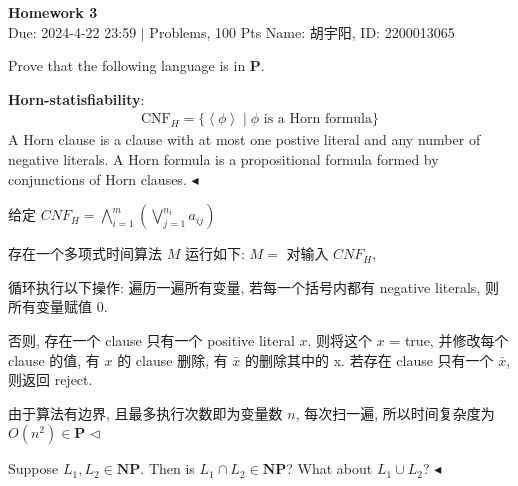 \documentclass[11pt]{article}
\newcommand{\mP}{\mathbf{P}}
\newcommand{\NP}{\mathbf{NP}}
\newenvironment{problem}[2][Problem]{\begin{trivlist}
		\item[\hskip \labelsep {\bfseries #1}\hskip \labelsep {\bfseries #2.}]}{\hfill$\blacktriangleleft$\end{trivlist}}
\newenvironment{answer}[1][Answer]{\begin{trivlist}
		\item[\hskip \labelsep {\bfseries #1.}\hskip \labelsep]}{\hfill$\lhd$\end{trivlist}}
\begin{document}
	\pagestyle{fancy}
	\chead{}
	\begin{center}
		{\LARGE \bf Homework 3}\\
		{Due: 2024-4-22 23:59 \quad$|$ Problems, 100 Pts}
		{Name: 胡宇阳, ID: 2200013065}
	\end{center}
	\begin{problem}{1.(18 points)}
		Prove that the following language is in $\mP$.
		
		\textbf{Horn-statisfiability}:
		\begin{align*}
			\text{CNF}_H = \{ \left\langle\phi\right\rangle \mid \phi \text{ is a Horn formula}\}
		\end{align*}
		A Horn clause is a clause with at most one postive literal and any number of negative literals. A Horn formula is a propositional formula formed by conjunctions of Horn clauses.
	\end{problem}
	\begin{answer}
		给定 $CNF_H=\bigwedge\limits_{i=1}^{m}\left(\bigvee\limits_{j=1}^{n_i}{a_{ij}}\right)$
		
		存在一个多项式时间算法 $M$ 运行如下:
		$M=$ 对输入 $CNF_H$,
		
		循环执行以下操作:
		遍历一遍所有变量, 若每一个括号内都有 negative literals, 则所有变量赋值 $0$.
		
		否则, 存在一个 clause 只有一个 positive literal $x$. 则将这个 $x$ = true, 并修改每个 clause 的值, 有 $x$ 的 clause 删除, 有 $\bar{x}$ 的删除其中的 x. 若存在 clause 只有一个 $\bar{x}$, 则返回 reject.
		
		由于算法有边界, 且最多执行次数即为变量数 $n$, 每次扫一遍, 所以时间复杂度为 $O(n^2)\in \mP$
	\end{answer}
	\begin{problem}{2.(14 points)}
		Suppose $L_1, L_2 \in \NP$. Then is $L_1 \cap L_2 \in \mathbf{NP}$? What about $L_1 \cup L_2$?
	\end{problem}
\end{document}
